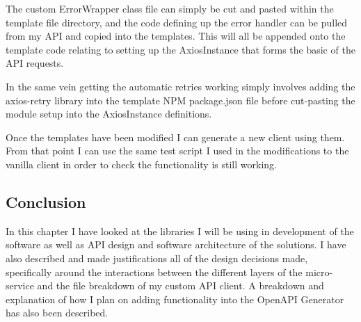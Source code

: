 The custom ErrorWrapper class file can simply be cut and pasted within the template file directory, and the code defining up the error handler can be pulled from my API and copied into the templates. This will all be appended onto the template code relating to setting up the AxiosInstance that forms the basic of the API requests.

In the same vein getting the automatic retries working simply involves adding the axios-retry library into the template NPM package.json file  before cut-pasting the module setup into the AxiosInstance definitions.

Once the templates have been modified I can generate a new client using them. From that point I can use the same test script I used in the modifications to the vanilla client in order to check the functionality is still working.
\subsection{Conclusion}
In this chapter I have looked at the libraries I will be using in development of the software as well as API design and software architecture of the solutions. I have also described and made justifications all of the design decisions made, specifically around the interactions between the different layers of the micro-service and the file breakdown of my custom API client. A breakdown and explanation of how I plan on adding functionality into the OpenAPI Generator has also been described.